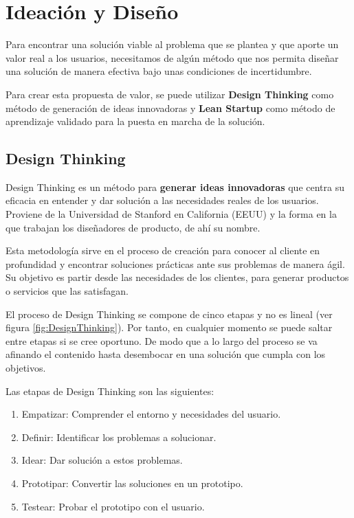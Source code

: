 \documentclass[12pt,twoside,titlepage]{report}
\newcommand\blankpage{%
    \newpage
    \null
    \thispagestyle{empty}%
    \newpage}
\begin{document}



\chapter{Ideación y Diseño}

Para encontrar una solución viable al problema que se plantea y que aporte un valor real a los usuarios, necesitamos de algún método que nos permita diseñar una solución de manera efectiva bajo unas condiciones de incertidumbre.

Para crear esta propuesta de valor, se puede utilizar \textbf{Design Thinking} como método de generación de ideas innovadoras y \textbf{Lean Startup} como método de aprendizaje validado para la puesta en marcha de la solución.

\section{Design Thinking}

Design Thinking es un método para \textbf{generar ideas innovadoras} que centra su eficacia en entender y dar solución a las necesidades reales de los usuarios. Proviene de la Universidad de Stanford en California (EEUU) y la forma en la que trabajan los diseñadores de producto, de ahí su nombre.

Esta metodología sirve en el proceso de creación para conocer al cliente en profundidad y encontrar soluciones prácticas ante sus problemas de manera ágil. Su objetivo es partir desde las necesidades de los clientes, para generar productos o servicios que las satisfagan.

El proceso de Design Thinking se compone de cinco etapas y no es lineal (ver figura \ref{fig:DesignThinking}). Por tanto, en cualquier momento se puede saltar entre etapas si se cree oportuno. De modo que a lo largo del proceso se va afinando el contenido hasta desembocar en una solución que cumpla con los objetivos. 

Las etapas de Design Thinking son las siguientes:
\begin{enumerate}
    \item Empatizar: Comprender el entorno y necesidades del usuario. 
    \item Definir: Identificar los problemas a solucionar. 
    \item Idear: Dar solución a estos problemas. 
    \item Prototipar: Convertir las soluciones en un prototipo. 
    \item Testear: Probar el prototipo con el usuario.
\end{enumerate}
\end{document}
